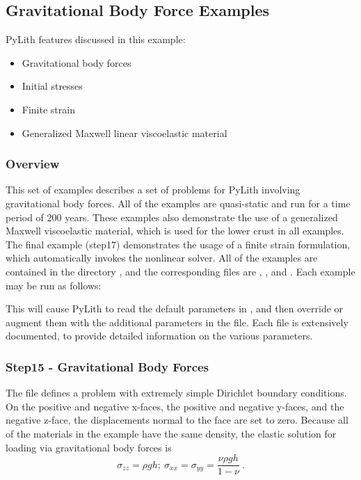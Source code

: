 \subsection{Gravitational Body Force Examples}
\label{sec:example:3dhex8:gravity}

PyLith features discussed in this example:
\begin{itemize}
\item Gravitational body forces
\item Initial stresses
\item Finite strain
\item Generalized Maxwell linear viscoelastic material
\end{itemize}

\subsubsection{Overview}

This set of examples describes a set of problems for PyLith involving
gravitational body forces. All of the examples are quasi-static and
run for a time period of 200 years. These examples also demonstrate
the use of a generalized Maxwell viscoelastic material, which is used
for the lower crust in all examples. The final example (step17)
demonstrates the usage of a finite strain formulation, which
automatically invokes the nonlinear solver. All of the examples are
contained in the directory , and the
corresponding  files are ,
, and .  Each example may be
run as follows:
This will cause PyLith to read the default parameters in
, and then override or augment them with the
additional parameters in the  file. Each
 file is extensively documented, to provide detailed
information on the various parameters.


\subsubsection{Step15 - Gravitational Body Forces}

The  file defines a problem with extremely simple
Dirichlet boundary conditions. On the positive and negative x-faces,
the positive and negative y-faces, and the negative z-face, the
displacements normal to the face are set to zero. Because all of the
materials in the example have the same density, the elastic solution
for loading via gravitational body forces is
\begin{equation}
\sigma_{zz}=\rho gh;\:\sigma_{xx}=\sigma_{yy}=\frac{\nu\rho gh}{1-\nu}\:.\label{eq:1-1}
\end{equation}

